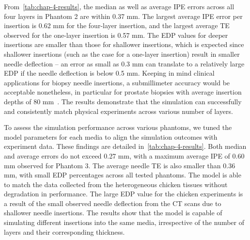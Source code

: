 From~\cref{tab:chap-4-results}, the median as well as average IPE errors across all four layers in Phantom 2 are within 0.37 mm. The largest average IPE error per insertion is 0.62 mm for the four-layer insertion, and the largest average TE observed for the one-layer insertion is 0.57 mm. The EDP values for deeper insertions are smaller than those for shallower insertions, which is expected since shallower insertions (such as the case for a one-layer insertion) result in smaller needle deflection -- an error as small as 0.3 mm can translate to a relatively large EDP if the needle deflection is below 0.5 mm. Keeping in mind clinical applications for biopsy needle insertions, a submillimeter accuracy would be acceptable nonetheless, in particular for prostate biopsies with average insertion depths of 80 mm~\parencite{moreiraEvaluationRobotAssistedMRIGuided2018}. The results demonstrate that the simulation can successfully and consistently match physical experiments across various number of layers.

To assess the simulation performance across various phantoms, we tuned the model parameters for each media to align the simulation outcomes with experiment data. These findings are detailed in~\cref{tab:chap-4-results}. Both median and average errors do not exceed 0.27 mm, with a maximum average IPE of 0.60 mm observed for Phantom 3. The average needle TE is also smaller than 0.36 mm, with small EDP percentages across all tested phantoms. The model is able to match the data collected from the heterogeneous chicken tissues without degradation in performance. The large EDP value for the chicken experiments is a result of the small observed needle deflection from the CT scans due to shallower needle insertions. The results show that the model is capable of simulating different insertions into the same media, irrespective of the number of layers and their corresponding thickness. 

